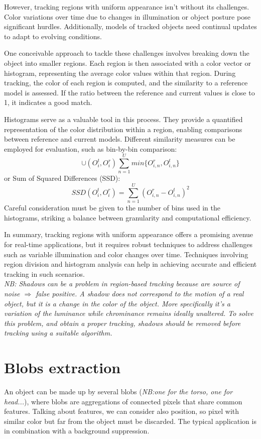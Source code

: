 However, tracking regions with uniform appearance isn't without its challenges. 
Color variations over time due to changes in illumination or object posture pose significant hurdles. 
Additionally, models of tracked objects need continual updates to adapt to evolving conditions.

One conceivable approach to tackle these challenges involves breaking down the object into smaller regions. 
Each region is then associated with a color vector or histogram, representing the average color values within that region. 
During tracking, the color of each region is computed, and the similarity to a reference model is assessed. 
If the ratio between the reference and current values is close to 1, it indicates a good match.

Histograms serve as a valuable tool in this process. 
They provide a quantified representation of the color distribution within a region, enabling comparisons between reference and current models. 
Different similarity measures can be employed for evaluation, such as bin-by-bin comparison: \[\cup (O_i^t, O_i^r) \sum_{n=1}^{U} min \{O_{i,n}^r, O_{i,n}^t\} \]
or Sum of Squared Differences (SSD): \[SSD(O_i^t, O_i^r) = \sum_{n=1}^{U} (O_{i,n}^r - O_{i,n}^t)^2 \]
Careful consideration must be given to the number of bins used in the histograms, striking a balance between granularity and computational efficiency.

In summary, tracking regions with uniform appearance offers a promising avenue for real-time applications, but it requires robust techniques to address challenges such as variable illumination and color changes over time. 
Techniques involving region division and histogram analysis can help in achieving accurate and efficient tracking in such scenarios.
\\\textit{NB: Shadows can be a problem in region-based tracking because are source of noise $\Rightarrow$ false positive. A shadow does not correspond to the motion of a real object, but it is a change in the color of the object. 
More specifically it's a variation of the luminance while chrominance remains ideally unaltered. To solve this problem, and obtain a proper tracking, shadows should be removed before tracking using a suitable algorithm.}

\section{Blobs extraction} 
An object can be made up by several blobs (\textit{NB:one for the torso, one for head...}), where blobs are aggregations of connected pixels that share common features.
Talking about features, we can consider also position, so pixel with similar color but far from the object must be discarded.
The typical application is in combination with a background suppression.
